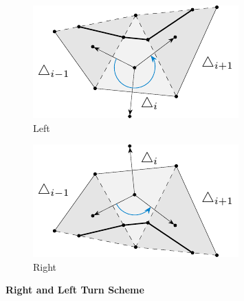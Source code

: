 \documentclass{stdlocal}
\begin{document}
  \begin{figure}
    \centering
    \begin{subfigure}[b]{0.45\linewidth}
      \centering
      \includegraphics[width=\linewidth]{figures/surface-mesh-curve-rot-left.pdf}
      \caption{Left}
    \end{subfigure}
    \hfill
    \begin{subfigure}[b]{0.45\linewidth}
      \centering
      \includegraphics[width=\linewidth]{figures/surface-mesh-curve-rot-right.pdf}
      \caption{Right}
    \end{subfigure}
    \caption[Right and Left Turn Scheme]{
      \textbf{Right and Left Turn Scheme}\\
    }
  \end{figure}
\end{document}
